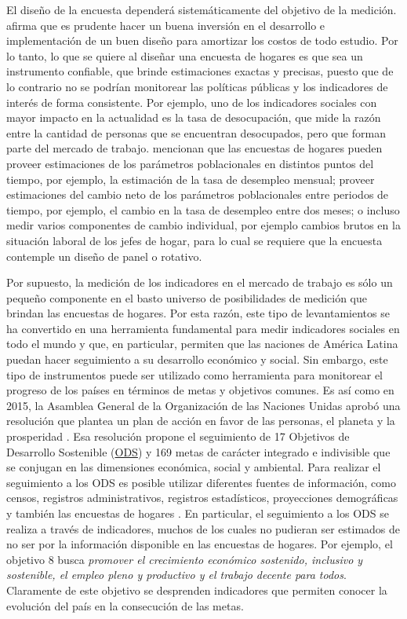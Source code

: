 \documentclass[12pt,spanish,]{book}
\begin{document}
El diseño de la encuesta dependerá sistemáticamente del objetivo de la medición. \textcite{Kalton_2009} afirma que es prudente hacer un buena inversión en el desarrollo e implementación de un buen diseño para amortizar los costos de todo estudio. Por lo tanto, lo que se quiere al diseñar una encuesta de hogares es que sea un instrumento confiable, que brinde estimaciones exactas y precisas, puesto que de lo contrario no se podrían monitorear las políticas públicas y los indicadores de interés de forma consistente. Por ejemplo, uno de los indicadores sociales con mayor impacto en la actualidad es la tasa de desocupación, que mide la razón entre la cantidad de personas que se encuentran desocupados, pero que forman parte del mercado de trabajo. \textcite{Duncan_Kalton_1987} mencionan que las encuestas de hogares pueden proveer estimaciones de los parámetros poblacionales en distintos puntos del tiempo, por ejemplo, la estimación de la tasa de desempleo mensual; proveer estimaciones del cambio neto de los parámetros poblacionales entre periodos de tiempo, por ejemplo, el cambio en la tasa de desempleo entre dos meses; o incluso medir varios componentes de cambio individual, por ejemplo cambios brutos en la situación laboral de los jefes de hogar, para lo cual se requiere que la encuesta contemple un diseño de panel o rotativo.

Por supuesto, la medición de los indicadores en el mercado de trabajo es sólo un pequeño componente en el basto universo de posibilidades de medición que brindan las encuestas de hogares. Por esta razón, este tipo de levantamientos se ha convertido en una herramienta fundamental para medir indicadores sociales en todo el mundo y que, en particular, permiten que las naciones de América Latina puedan hacer seguimiento a su desarrollo económico y social. Sin embargo, este tipo de instrumentos puede ser utilizado como herramienta para monitorear el progreso de los países en términos de metas y objetivos comunes. Es así como en 2015, la Asamblea General de la Organización de las Naciones Unidas aprobó una resolución que plantea un plan de acción en favor de las personas, el planeta y la prosperidad \autocite{United_Nations_2015}. Esa resolución propone el seguimiento de 17 Objetivos de Desarrollo Sostenible (\href{https://sustainabledevelopment.un.org}{ODS}) y 169 metas de carácter integrado e indivisible que se conjugan en las dimensiones económica, social y ambiental. Para realizar el seguimiento a los ODS es posible utilizar diferentes fuentes de información, como censos, registros administrativos, registros estadísticos, proyecciones demográficas y también las encuestas de hogares \autocite{United_Nations_2016}. En particular, el seguimiento a los ODS se realiza a través de indicadores, muchos de los cuales no pudieran ser estimados de no ser por la información disponible en las encuestas de hogares. Por ejemplo, el objetivo 8 busca \emph{promover el crecimiento económico sostenido, inclusivo y sostenible, el empleo pleno y productivo y el trabajo decente para todos}. Claramente de este objetivo se desprenden indicadores que permiten conocer la evolución del país en la consecución de las metas.
\end{document}
